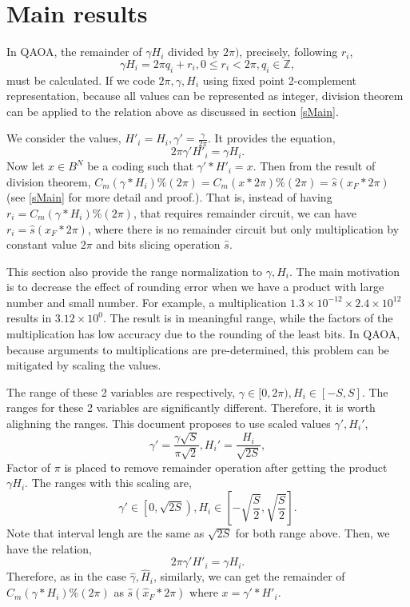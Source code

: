 \documentclass[a4paper]{article}
\newcommand{\eqlabel}[1]{\label{#1}
}
\newcommand{\sbr}[1]{\left[#1\right]}
\newcommand{\sZ}{\mathbb{Z}}
\newcommand{\hx}{{\hat{x}}}
\newcommand{\hs}{{\hat{s}}}
\begin{document}
\section{Main results}
In QAOA, the remainder of \(\gamma H_i\) divided by \(2\pi)\), precisely, following \(r_i\),
\[
    \gamma H_i = 2\pi q_i + r_i, 0\leq r_i < 2\pi, q_i\in \sZ,
\]
must be calculated. If we code \(2\pi, \gamma, H_i\) using fixed point 2-complement representation, because all values can be represented as integer, division theorem can be applied to the relation above as discussed in section \ref{sMain}.

We consider the values, \(H'_i =  H_i,  \gamma' = \frac{\gamma}{2\pi}\). It provides the equation,
\[
2\pi \gamma' H'_i = \gamma H_i.
\]
Now let \(x\in B^N\) be a coding such that \(\gamma' * H'_i = x\). Then from the result of division theorem, \(C_m(\gamma*H_i)\% (2\pi) = C_m(x*2\pi)\% (2\pi) =\hs(x_F * 2\pi)\) (see \ref{sMain} for more detail and proof.). That is, instead of having \(r_i = C_m(\gamma *H_i)\% (2\pi) \), that requires remainder circuit, we can have \(r_i = \hs(x_F * 2\pi)\), where there is no remainder circuit but only multiplication by constant value \(2\pi\) and bits slicing operation \(\hs\).

This section also provide the range normalization to  \(\gamma, H_i\). The main motivation is to decrease the effect of rounding error when we have a product with large number and small number. For example, a multiplication \(1.3\times 10^{-12} \times 2.4 \times 10^{12}\) results in \(3.12\times 10^{0}\). The result is in meaningful range, while the factors of the multiplication has low accuracy due to the rounding of the least bits. In QAOA, because arguments to multiplications are pre-determined, this problem can be mitigated by scaling the values.

The range of these 2 variables are respectively, \(\gamma\in [0, 2\pi), H_i\in [-S, S]\). The ranges for these 2 variables are significantly different. Therefore, it is worth alighning the ranges. This document proposes to use scaled values \(\gamma', H_i'\),
\begin{equation}
    \eqlabel{eNormGM}
    \gamma' = \frac{\gamma \sqrt{S}}{\pi\sqrt{2}}, H_i' =  \frac{H_i}{\sqrt{2S}}, 
\end{equation}
Factor of \(\pi\) is placed to remove remainder operation after getting the product \(\gamma H_i\). The ranges with this scaling are,
\[
 \gamma'\in \left [0, \sqrt{2S}\right ), H_i\in \sbr{-\sqrt{\frac{S}{2}}, \sqrt{\frac{S}{2}}}.
\]
Note that interval lengh are the same as \(\sqrt{2S}\) for both range above. Then, we have the relation,
\[
    2\pi \gamma' H'_i = \gamma H_i.
\]
Therefore, as in the case \(\hat{\gamma}, \hat{H}_i\), similarly, we can get the remainder of \(C_m(\gamma * H_i)\% (2\pi)\) as \(\hs(\hx_F*2\pi)\) where \(x = \gamma' * H'_i\).
 
\end{document}
